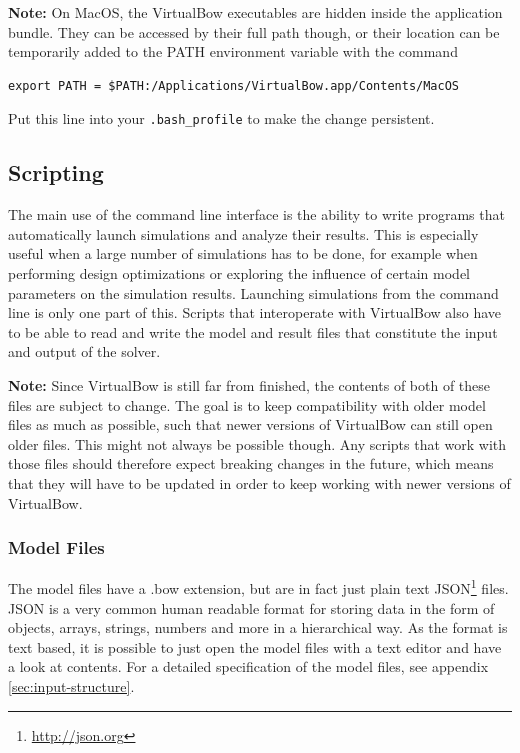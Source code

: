 \documentclass[12pt]{article}
\begin{document}
\bigskip

\textbf{Note:} On MacOS, the VirtualBow executables are hidden inside the application bundle.
They can be accessed by their full path though, or their location can be temporarily added to the PATH environment variable with the command

\begin{framed}
\begin{verbatim}
export PATH = $PATH:/Applications/VirtualBow.app/Contents/MacOS
\end{verbatim}
\end{framed}

Put this line into your \texttt{.bash\_profile} to make the change persistent.

\newpage
\subsection{Scripting}

The main use of the command line interface is the ability to write programs that automatically launch simulations and analyze their results.
This is especially useful when a large number of simulations has to be done, for example when performing design optimizations or exploring the influence of certain model parameters on the simulation results.
Launching simulations from the command line is only one part of this.
Scripts that interoperate with VirtualBow also have to be able to read and write the model and result files that constitute the input and output of the solver.

\textbf{Note:} Since VirtualBow is still far from finished, the contents of both of these files are subject to change.
The goal is to keep compatibility with older model files as much as possible, such that newer versions of VirtualBow can still open older files.
This might not always be possible though.
Any scripts that work with those files should therefore expect breaking changes in the future, which means that they will have to be updated in order to keep working with newer versions of VirtualBow.

\subsubsection*{Model Files}

The model files have a .bow extension, but are in fact just plain text JSON\footnote{\url{http://json.org}} files.
JSON is a very common human readable format for storing data in the form of objects, arrays, strings, numbers and more in a hierarchical way.
As the format is text based, it is possible to just open the model files with a text editor and have a look at contents.
For a detailed specification of the model files, see appendix \ref{sec:input-structure}.
\end{document}
